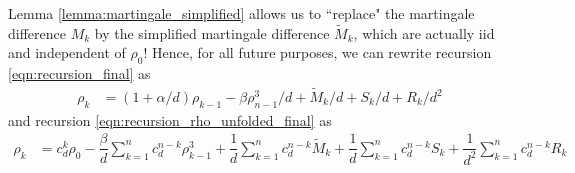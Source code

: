 \documentclass[12pt]{article}
\begin{document}
\medskip

Lemma \ref{lemma:martingale_simplified} allows us to ``replace" the martingale difference $M_k$ by the simplified martingale difference $\tilde M_k$, which are actually iid and independent of $\rho_0$! Hence, for all future purposes, we can rewrite recursion \ref{eqn:recursion_final} as
\begin{align}\label{eqn:recursion_final_simplified}
    \rho_k &= (1+\alpha/d)\rho_{k-1} - \beta\rho^3_{n-1}/d + \tilde M_k/d + S_k/d + R_k/d^2
\end{align}and recursion \ref{eqn:recursion_rho_unfolded_final} as
\begin{align}\label{eqn:recursion_unfolded_final_simplified}
    \rho_k &= c_d^k\rho_0 - \dfrac{\beta}{d}\sum_{k=1}^n c_d^{n-k}\rho^3_{k-1} + \dfrac{1}{d}\sum_{k=1}^n c_d^{n-k}\tilde M_k + \dfrac{1}{d}\sum_{k=1}^n c_d^{n-k}S_k + \dfrac{1}{d^2}\sum_{k=1}^n c_d^{n-k}R_k
\end{align}

\medskip
\end{document}
